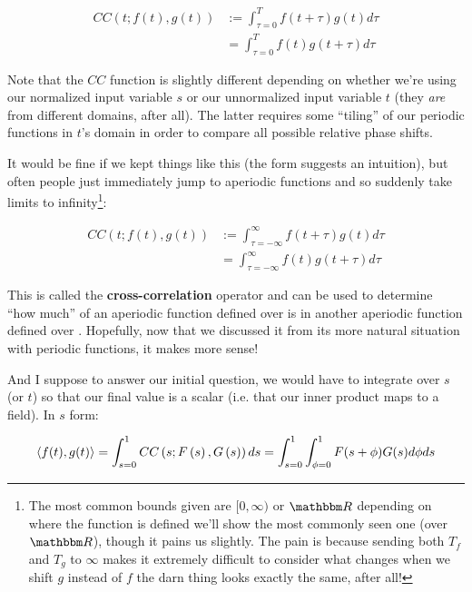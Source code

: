\documentclass[letterpaper,12pt]{report}
\begin{document}
\[ \begin{split}
  CC(t; f(t), g(t)) &:= 
    \int_{\tau = 0}^{T} f(t + \tau) g(t) d\tau \\
    &= \int_{\tau = 0}^{T} f(t) g(t + \tau) d\tau
\end{split}
\]

Note that the \(CC\) function is slightly different depending
on whether we're using our normalized input variable \(s\) or
our unnormalized input variable \(t\) (they \emph{are}
from different domains, after all). The latter
requires some ``tiling'' of our periodic functions in
\(t\)'s domain
in order to compare all possible relative phase shifts.\par

It would be fine if we kept things like this (the form suggests
an intuition), but often people just immediately jump to
aperiodic functions and so suddenly take limits to infinity\footnote
{
  The most common bounds given are
  \([0, \infty)\) or \(\domain{R}\) depending on where
  the function is defined \textemdash{} we'll show the most
  commonly seen one (over \(\domain{R}\)), though it pains us slightly.
  The pain is because sending both \(T_f\) and \(T_g\) to \(\infty\)
  makes it extremely difficult to consider what changes when we
  shift \(g\) instead of \(f\) \textemdash{} the darn thing
  looks exactly the same, after all!
}:

\[ \begin{split}
  CC(t; f(t), g(t)) &:= 
    \int_{\tau = -\infty}^{\infty} f(t + \tau) g(t) d\tau \\
    &= \int_{\tau = -\infty}^{\infty} f(t) g(t + \tau) d\tau
\end{split}
\]

This is called the \textbf{cross-correlation}
operator
and can be used to determine ``how much'' of an aperiodic 
function defined over  is in another aperiodic function 
defined over . Hopefully, now that we discussed it
from its more natural situation with periodic functions,
it makes more sense! \par

And I suppose to answer our initial question,
we would have to integrate over \(s\) (or \(t\)) so that
our final value is a scalar (i.e. that our inner product maps
to a field). In \(s\) form:

\[ \left<f(t),g(t)\right> =
\int_{s=0}^{1}CC\left(s; F\left(s\right), G\left(s\right)\right) ds = 
\int_{s=0}^{1} \int_{\phi = 0}^{1} F(s + \phi) G(s) d\phi ds
\]
\end{document}
